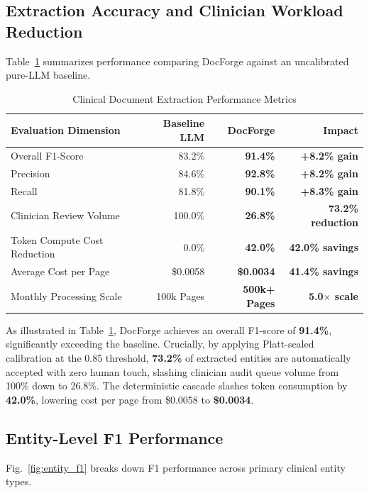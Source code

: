 \documentclass[10pt,journal,compsoc]{IEEEtran}
\begin{document}
\subsection{Extraction Accuracy and Clinician Workload Reduction}
Table~\ref{tab:benchmarks} summarizes performance comparing DocForge against an uncalibrated pure-LLM baseline.

\begin{table}[h]
\centering
\caption{Clinical Document Extraction Performance Metrics}
\label{tab:benchmarks}
\begin{tabular}{lrrr}
\toprule
\textbf{Evaluation Dimension} & \textbf{Baseline LLM} & \textbf{DocForge} & \textbf{Impact} \\
\midrule
Overall F1-Score             & 83.2\%                & \textbf{91.4\%}   & \textbf{+8.2\% gain} \\
Precision                    & 84.6\%                & \textbf{92.8\%}   & \textbf{+8.2\% gain} \\
Recall                       & 81.8\%                & \textbf{90.1\%}   & \textbf{+8.3\% gain} \\
Clinician Review Volume      & 100.0\%               & \textbf{26.8\%}   & \textbf{73.2\% reduction} \\
Token Compute Cost Reduction & 0.0\%                 & \textbf{42.0\%}   & \textbf{42.0\% savings} \\
Average Cost per Page        & \$0.0058              & \textbf{\$0.0034} & \textbf{41.4\% savings} \\
Monthly Processing Scale     & 100k Pages            & \textbf{500k+ Pages}& \textbf{5.0$\times$ scale} \\
\bottomrule
\end{tabular}
\end{table}

As illustrated in Table~\ref{tab:benchmarks}, DocForge achieves an overall F1-score of \textbf{91.4\%}, significantly exceeding the baseline. Crucially, by applying Platt-scaled calibration at the 0.85 threshold, \textbf{73.2\%} of extracted entities are automatically accepted with zero human touch, slashing clinician audit queue volume from 100\% down to 26.8\%. The deterministic cascade slashes token consumption by \textbf{42.0\%}, lowering cost per page from \$0.0058 to \textbf{\$0.0034}.

\subsection{Entity-Level F1 Performance}
Fig.~\ref{fig:entity_f1} breaks down F1 performance across primary clinical entity types.
\end{document}
